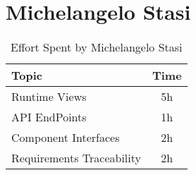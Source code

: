 \section*{Michelangelo Stasi}
\begin{table}[H]
    \renewcommand{\arraystretch}{1.5}
    \centering
    \begin{tabular}{|l|c|}
        \hline
        \textbf{Topic} & \textbf{Time} \\ \hline
        Runtime Views  & 5h       \\ \hline
        API EndPoints  & 1h       \\ \hline
        Component Interfaces & 2h  \\ \hline
        Requirements Traceability & 2h \\ \hline
    \end{tabular}
    \caption{Effort Spent by Michelangelo Stasi}
    \label{tab:stasi-effort-spent}
\end{table}
